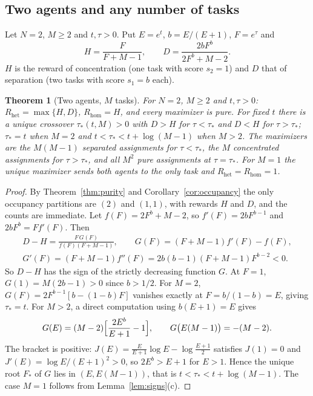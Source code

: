 \documentclass[11pt]{article}
\theoremstyle{plain}
\newtheorem{theorem}{Theorem}[section]
\theoremstyle{definition}
\theoremstyle{remark}
\newcommand{\Rhet}{R_{\mathrm{het}}}
\newcommand{\Rhom}{R_{\mathrm{hom}}}
\begin{document}
\subsection{Two agents and any number of tasks}\label{sec:twoM}

Let $N=2$, $M\ge2$ and $t,\tau>0$. Put $E=e^t$, $b=E/(E+1)$, $F=e^\tau$ and
\begin{equation}\label{eq:HD}
 H=\frac{F}{F+M-1},\qquad D=\frac{2bF^b}{2F^b+M-2}.
\end{equation}
$H$ is the reward of concentration (one task with score $s_2=1$) and $D$ that of separation (two tasks with score $s_1=b$ each).

\begin{theorem}[Two agents, $M$ tasks]\label{thm:twoM}
For $N=2$, $M\ge2$ and $t,\tau>0$: $\Rhet=\max\{H,D\}$, $\Rhom=H$, and every maximizer is pure. For fixed $t$ there is a unique crossover $\tau_*(t,M)>0$ with $D>H$ for $\tau<\tau_*$ and $D<H$ for $\tau>\tau_*$; $\tau_*=t$ when $M=2$ and $t<\tau_*<t+\log(M-1)$ when $M>2$. The maximizers are the $M(M-1)$ separated assignments for $\tau<\tau_*$, the $M$ concentrated assignments for $\tau>\tau_*$, and all $M^2$ pure assignments at $\tau=\tau_*$. For $M=1$ the unique maximizer sends both agents to the only task and $\Rhet=\Rhom=1$.
\end{theorem}

\begin{proof}
By Theorem~\ref{thm:purity} and Corollary~\ref{cor:occupancy} the only occupancy partitions are $(2)$ and $(1,1)$, with rewards $H$ and $D$, and the counts are immediate. Let $f(F)=2F^b+M-2$, so $f'(F)=2bF^{b-1}$ and $2bF^b=Ff'(F)$. Then
\begin{gather*}
 D-H=\frac{F\,G(F)}{f(F)(F+M-1)},\qquad G(F)=(F+M-1)f'(F)-f(F),\\
 G'(F)=(F+M-1)f''(F)=2b(b-1)(F+M-1)F^{b-2}<0 .
\end{gather*}
So $D-H$ has the sign of the strictly decreasing function $G$. At $F=1$, $G(1)=M(2b-1)>0$ since $b>1/2$. For $M=2$, $G(F)=2F^{b-1}[b-(1-b)F]$ vanishes exactly at $F=b/(1-b)=E$, giving $\tau_*=t$. For $M>2$, a direct computation using $b(E+1)=E$ gives
\[
 G(E)=(M-2)\Bigl[\frac{2E^b}{E+1}-1\Bigr],\qquad G\bigl(E(M-1)\bigr)=-(M-2).
\]
The bracket is positive: $J(E)=\frac{E}{E+1}\log E-\log\frac{E+1}2$ satisfies $J(1)=0$ and $J'(E)=\log E/(E+1)^2>0$, so $2E^b>E+1$ for $E>1$. Hence the unique root $F_*$ of $G$ lies in $(E,E(M-1))$, that is $t<\tau_*<t+\log(M-1)$. The case $M=1$ follows from Lemma~\ref{lem:signs}(c).
\end{proof}
\end{document}
